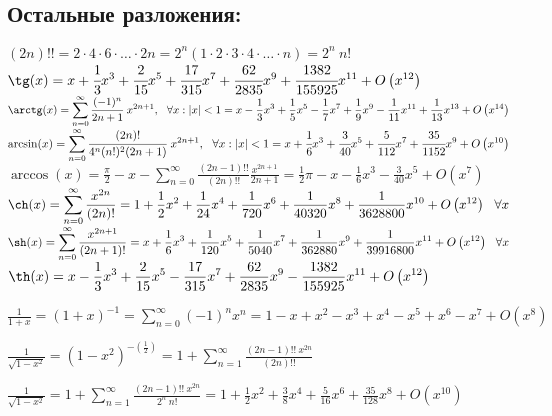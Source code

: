 \documentclass[12pt, a4paper]{article}
\begin{document}
\subsection{Остальные разложения:}
$ (2n)!! = 2 \cdot 4 \cdot 6 \cdot \ldots \cdot 2n = 2^n (1 \cdot 2 \cdot 3 \cdot 4 \cdot \ldots \cdot n)=2^n\ n! $
\newline \newline \newline
$\displaystyle \tg(x) = x+\cfrac{1}{3}x^{3}+\cfrac{2}{15} {x}^{5}+{\cfrac {17}{315}} {x}^{7}+{\cfrac {62}{2835}} {x}^{9}
\mbox{}+{\cfrac {1382}{155925}} {x}^{11}+O \left( {x}^{12} \right) $
\newline \newline
$\displaystyle  \arctg(x) = \sum\limits_{n=0}^\infty{\cfrac{(-1)^n}{2n+1}\ x^{2n+1}}, \ \ \forall x: |x|<1 = x-\frac{1}{3} {x}^{3}+\frac{1}{5} {x}^{5}-\frac{1}{7} {x}^{7}+\frac{1}{9} {x}^{9}-\frac{1}{11} {x}^{11}+\frac{1}{13} {x}^{13}+O \left( {x}^{14} \right)$
\newline \newline
$\displaystyle \arcsin(x) = \sum\limits_{n=0}^\infty{\cfrac{(2n)!}{4^n(n!)^2(2n+1)}\ x^{2n+1}}, \ \ \forall x: |x|<1 = x+\cfrac{1}{6} {x}^{3}+{\cfrac {3}{40}} {x}^{5}+{\cfrac {5}{112}} {x}^{7} + {\cfrac {35}{1152}} {x}^{9}+O \left( {x}^{10} \right)$
\newline \newline
$\displaystyle \arccos(x) = \frac{\pi}{2} - x - \sum\limits_{n=0}^\infty{\frac{(2n-1)!!}{(2n)!!}\frac{x^{2n+1}}{2n+1}} = \frac{1}{2} \pi -x-\frac{1}{6} {x}^{3}-{\frac {3}{40}} {x}^{5} + O \left( {x}^{7} \right)$
\newline \newline
$\displaystyle \ch(x) = \sum\limits_{n=0}^\infty{\frac{x^{2n}}{(2n)!}} = 1+\frac{1}{2}x^2+\frac{1}{24}x^4+\frac{1}{720}x^6+\frac{1}{40320}x^8+\frac{1}{3628800}x^{10} + O\left( {x}^{12} \right)\ \ \forall x$
\newline \newline
$\displaystyle \sh(x) = \sum\limits_{n=0}^\infty{\frac{x^{2n+1}}{(2n+1)!}} =  x+\frac{1}{6}x^3+\frac{1}{120}x^5+\frac{1}{5040}x^7+\frac{1}{362880}x^9+\frac{1}{39916800}x^{11} + O\left( {x}^{12} \right)\ \ \forall x$
\newline \newline
$\displaystyle \th(x) = x-\frac{1}{3}x^3+\frac{2}{15}x^5-\frac{17}{315}x^7+\frac{62}{2835}x^9-\frac{1382}{155925}x^{11} + O\left( {x}^{12} \right)$
\par \- \newline
$\displaystyle \frac{1}{1+x} = (1+x)^{-1} = \sum\limits_{n=0}^\infty{(-1)^n x^n} = 1-x+x^2-x^3+x^4-x^5+x^6-x^7+ O\left( {x}^{8} \right)$
\par \- \newline
$\displaystyle \frac{1}{\sqrt{1-x^2}} = (1-x^2)^{-\left(\frac{1}{2}\right)} = 1 + \sum\limits_{n=1}^\infty{\frac{(2n-1)!!\ x^{2n}}{(2n)!!}} $
\par \- \newline
$\displaystyle \frac{1}{\sqrt{1-x^2}} = 1 + \sum\limits_{n=1}^\infty{\frac{(2n-1)!!\ x^{2n}}{2^n\ n!}} = 1+\frac{1}{2}x^2+\frac{3}{8}x^4+\frac{5}{16}x^6+\frac{35}{128}x^8+ O\left({x}^{10} \right)$
\par \- \newline
\end{document}
